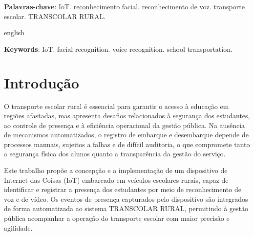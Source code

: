 \documentclass[
    12pt,
    openright,
    twoside,
    a4paper,
    chapter=TITLE,
    section=TITLE,
    english,
    brazil
    ]{abntex2}
\begin{document}
\begin{resumo}

    \vspace{\onelineskip}
    \noindent
    \textbf{Palavras-chave}: IoT. reconhecimento facial. reconhecimento de voz. transporte escolar. TRANSCOLAR RURAL.
\end{resumo}

\begin{resumo}[Abstract]
    \begin{otherlanguage*}{english}

        \vspace{\onelineskip}
        \noindent
        \textbf{Keywords}: IoT. facial recognition. voice recognition. school transportation.
    \end{otherlanguage*}
\end{resumo}

\tableofcontents*
\cleardoublepage

\textual

\chapter{Introdução}

O transporte escolar rural é essencial para garantir o acesso à educação em
regiões afastadas, mas apresenta desafios relacionados à segurança dos
estudantes, ao controle de presença e à eficiência operacional da gestão
pública. Na ausência de mecanismos automatizados, o registro de embarque e
desembarque depende de processos manuais, sujeitos a falhas e de difícil
auditoria, o que compromete tanto a segurança física dos alunos quanto a
transparência da gestão do serviço.

Este trabalho propõe a concepção e a implementação de um dispositivo de
Internet das Coisas (IoT) embarcado em veículos escolares rurais, capaz de
identificar e registrar a presença dos estudantes por meio de reconhecimento
de voz e de vídeo. Os eventos de presença capturados pelo dispositivo são
integrados de forma automatizada ao sistema TRANSCOLAR RURAL, permitindo à
gestão pública acompanhar a operação do transporte escolar com maior
precisão e agilidade.
\end{document}
